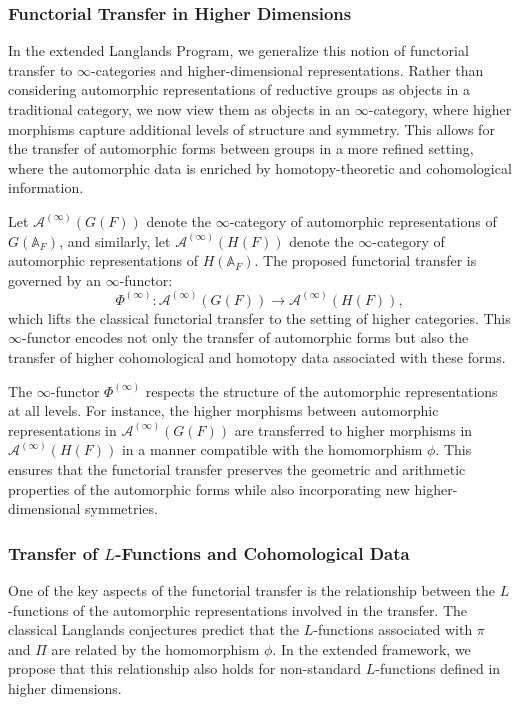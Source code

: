 \documentclass{article}
\theoremstyle{remark}
\begin{document}
\subsubsection{Functorial Transfer in Higher Dimensions}

In the extended Langlands Program, we generalize this notion of functorial transfer to $\infty$-categories and higher-dimensional representations. Rather than considering automorphic representations of reductive groups as objects in a traditional category, we now view them as objects in an $\infty$-category, where higher morphisms capture additional levels of structure and symmetry. This allows for the transfer of automorphic forms between groups in a more refined setting, where the automorphic data is enriched by homotopy-theoretic and cohomological information.

Let $\mathcal{A}^{(\infty)}(G(F))$ denote the $\infty$-category of automorphic representations of $G(\mathbb{A}_F)$, and similarly, let $\mathcal{A}^{(\infty)}(H(F))$ denote the $\infty$-category of automorphic representations of $H(\mathbb{A}_F)$. The proposed functorial transfer is governed by an $\infty$-functor:
\[
\Phi^{(\infty)}: \mathcal{A}^{(\infty)}(G(F)) \to \mathcal{A}^{(\infty)}(H(F)),
\]
which lifts the classical functorial transfer to the setting of higher categories. This $\infty$-functor encodes not only the transfer of automorphic forms but also the transfer of higher cohomological and homotopy data associated with these forms.

The $\infty$-functor $\Phi^{(\infty)}$ respects the structure of the automorphic representations at all levels. For instance, the higher morphisms between automorphic representations in $\mathcal{A}^{(\infty)}(G(F))$ are transferred to higher morphisms in $\mathcal{A}^{(\infty)}(H(F))$ in a manner compatible with the homomorphism $\phi$. This ensures that the functorial transfer preserves the geometric and arithmetic properties of the automorphic forms while also incorporating new higher-dimensional symmetries.

\subsubsection{Transfer of $L$-Functions and Cohomological Data}

One of the key aspects of the functorial transfer is the relationship between the $L$-functions of the automorphic representations involved in the transfer. The classical Langlands conjectures predict that the $L$-functions associated with $\pi$ and $\Pi$ are related by the homomorphism $\phi$. In the extended framework, we propose that this relationship also holds for non-standard $L$-functions defined in higher dimensions.
\end{document}
